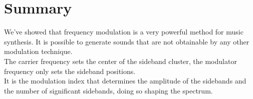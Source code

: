 \section{Summary}
We've showed that frequency modulation is a very powerful method for music synthesis. It is possible to generate sounds that are not obtainable by any other modulation technique.\\
The carrier frequency sets the center of the sideband cluster, the modulator frequency only sets the sideband positions.\\
It is the modulation index that determines the amplitude of the sidebands and the number of significant sidebands, doing so shaping the spectrum.
